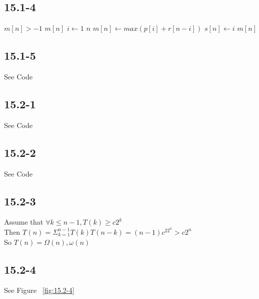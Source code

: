 \documentclass[]{article}
\begin{document}
\subsection{15.1-4}
\begin{codebox}
	\li \If $m[n] > -1$ 
	\li 	\Then \Return $m[n]$ \End
	\li  \Else
	\li   \Then \For $i \leftarrow 1$ \To $n$ 
	\li     \Do $m[n] \leftarrow max (p[i] + r[n-i])$
	\li 	$s[n] \leftarrow i$ \End
	\li \Return $m[n]$
\end{codebox}

\subsection{15.1-5}
See Code

\subsection{15.2-1}
See Code

\subsection{15.2-2}
See Code

\subsection{15.2-3}

Assume that $\forall k \le n-1, T(k) \ge c2^k$\\
Then $T(n) = \Sigma_{k = 1}^{n-1} T(k)T(n-k) = (n-1)c^22^n > c2^n$\\
So $T(n) = \Omega (n), \omega(n)$

\subsection{15.2-4}
See Figure ~\ref{fig:15.2-4}
\end{document}
